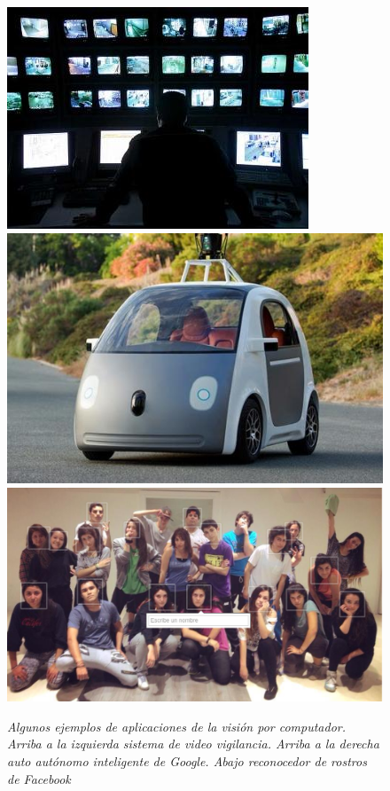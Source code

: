 \begin{figure}[h]
  \centering
  \includegraphics[scale=.42]{images/vigilancia}
  \includegraphics[scale=.36]{images/googleauto}
  \includegraphics[scale=.25]{images/faces}
  \caption{\em Algunos ejemplos de aplicaciones de la visión por computador. Arriba a la izquierda sistema de video vigilancia. Arriba a la derecha auto autónomo inteligente de Google. Abajo reconocedor de rostros de Facebook}  
  \label{fig:ejemplosaplicacion}
\end{figure}

